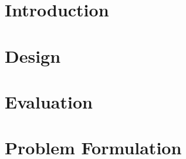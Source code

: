 \documentclass[12pt]{article}
\begin{document}

\section{Introduction}





  


\section{Design}


     

             

            

   
             






\section{Evaluation}

  
    


\appendix


\section{Problem Formulation}               
       
            

\end{document}
